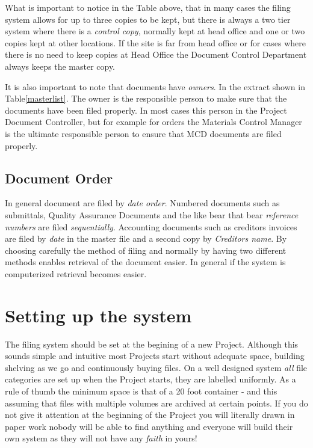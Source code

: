 What is important to notice in the Table above, that in many cases the filing system allows for up to three copies to be kept, but there is always a two tier system where there is a \textit{control copy}, normally kept at head office and one or two copies kept at other locations. If the site is far from head office or for cases where there is no need to keep copies at Head Office the Document Control Department always keeps the master copy.

It is also important to note that documents have \textit{owners}. In the extract shown in Table\ref{masterlist}. The owner is the responsible person to make sure that the documents have been filed properly. In most cases this person in the Project Document Controller, but for example for orders the Materials Control Manager is the ultimate responsible person to ensure that MCD documents are filed properly.

\subsection*{Document Order}

In general document are filed by \textit{date order}. Numbered documents such as submittals, Quality Assurance Documents and the like bear that bear \textit{reference numbers} are filed \textit{sequentially}. Accounting documents
such as creditors invoices are filed by \textit{date} in the master file and a second copy by \textit{Creditors name}. By choosing
carefully the method of filing and normally by having two different methods enables retrieval of the document easier. In general if the system
is computerized retrieval becomes easier.  

\section*{Setting up the system}

The filing system should be set at the begining of a new Project. Although this sounds simple and intuitive most Projects start without adequate
space, building shelving as we go and continuously buying files. On a well designed system \textit{all} file categories are set up when the Project starts, they are labelled uniformly. As a rule of thumb the minimum space is that of a 20 foot container - and this assuming that files with multiple volumes are archived at certain points. If you do not give it attention at the beginning of the Project you will literally
drawn in paper work nobody will be able to find anything and  everyone will build their own system as they will not have any \textit{faith} in yours!


